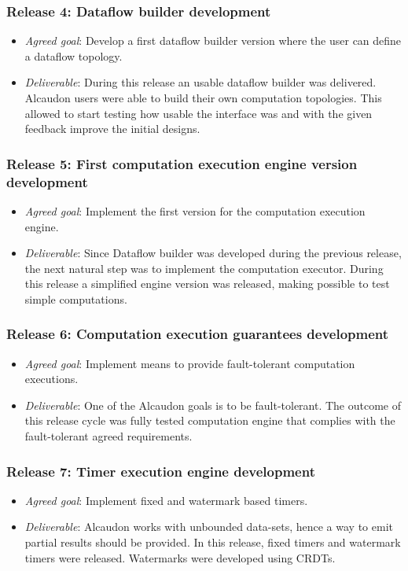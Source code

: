 \subsubsection{Release 4: Dataflow builder development}
\begin{itemize}
\item \textit{Agreed goal}: Develop a first dataflow builder version where the
  user can define a dataflow topology.
\item \textit{Deliverable}: During this release an usable dataflow builder was
  delivered. Alcaudon users were able to build their own computation topologies.
  This allowed to start testing how usable the interface was and with the given
  feedback improve the initial designs.
\end{itemize}

\subsubsection{Release 5: First computation execution engine version development}
\begin{itemize}
\item \textit{Agreed goal}: Implement the first version for the computation
  execution engine.
\item \textit{Deliverable}: Since Dataflow builder was developed during the previous
  release, the next natural step was to implement the computation executor.
  During this release a simplified engine version was released, making possible
  to test simple computations.
\end{itemize}

\subsubsection{Release 6: Computation execution guarantees development}
\begin{itemize}
\item \textit{Agreed goal}: Implement means to provide fault-tolerant computation executions.
\item \textit{Deliverable}: One of the Alcaudon goals is to be fault-tolerant.
  The outcome of this release cycle was fully tested computation engine that
  complies with the fault-tolerant agreed requirements.
\end{itemize}

\subsubsection{Release 7: Timer execution engine development}
\begin{itemize}
\item \textit{Agreed goal}: Implement fixed and watermark based timers.
\item \textit{Deliverable}: Alcaudon works with unbounded data-sets, hence a way
  to emit partial results should be provided. In this release, fixed timers and watermark
  timers were released. Watermarks were developed using \acs{CRDT}s.
\end{itemize}

